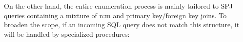
On the other hand, the entire enumeration process is mainly tailored to SPJ queries containing a mixture of n:m and primary key/foreign key joins. 
To broaden the scope, if an incoming SQL query does not match this structure, it will be handled by specialized procedures:


